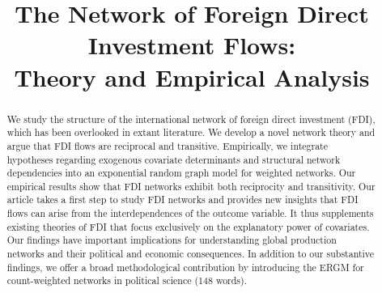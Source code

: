 \documentclass[reqno,onecolumn,letterpaper,12pt]{article}
\begin{document}
\title{The Network of Foreign Direct Investment Flows: \\Theory and Empirical Analysis} %
\date{}
\maketitle

\thispagestyle{empty}
\singlespacing
\begin{abstract}
    \noindent We study the structure of the international network of foreign direct investment (FDI), which has been overlooked in extant literature. We develop a novel network theory and argue that FDI flows are reciprocal and transitive. Empirically, we integrate hypotheses regarding exogenous covariate determinants and structural network dependencies into an exponential random graph model for weighted networks. Our empirical results show that FDI networks exhibit both reciprocity and transitivity. Our article takes a first step to study FDI networks and provides new insights that FDI flows can arise from the interdependences of the outcome variable. It thus supplements existing theories of FDI that focus exclusively on the explanatory power of covariates. Our findings have important implications for understanding global production networks and their political and economic consequences.  In addition to our substantive findings, we offer a broad methodological contribution by introducing the ERGM for count-weighted networks in political science (148 words).



\end{abstract}
~\\
\end{document}
